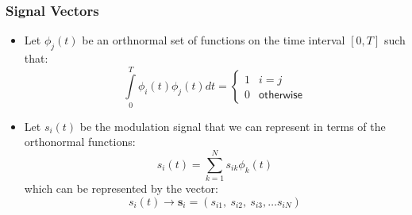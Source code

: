 \documentclass{beamer}
\begin{document}
\frame
{
  \frametitle{Signal Vectors}

    \begin{itemize}
        \item Let $\phi_j(t)$ be an orthnormal set of functions on the time interval $[0,T]$ such that:
        \begin{equation}
            \int\limits_0^T\phi_i(t)\phi_j(t)dt=\left\{
            \begin{array}{ll}
              1 & i=j \\
              0 & \mathsf{otherwise}
            \end{array}
            \right.\nonumber
        \end{equation}
        \item Let $s_i(t)$ be the modulation signal that we can represent in terms of the orthonormal functions:
        \begin{equation}
            s_i(t)=\sum\limits_{k=1}^{N}s_{ik}\phi_k(t)
        \end{equation}
        which can be represented by the vector:
        \begin{equation}
            s_i(t)\rightarrow\mathbf{s}_i=(s_{i1},~s_{i2},~s_{i3},\ldots{s_{iN}})
        \end{equation}
    \end{itemize}

}
\end{document}
